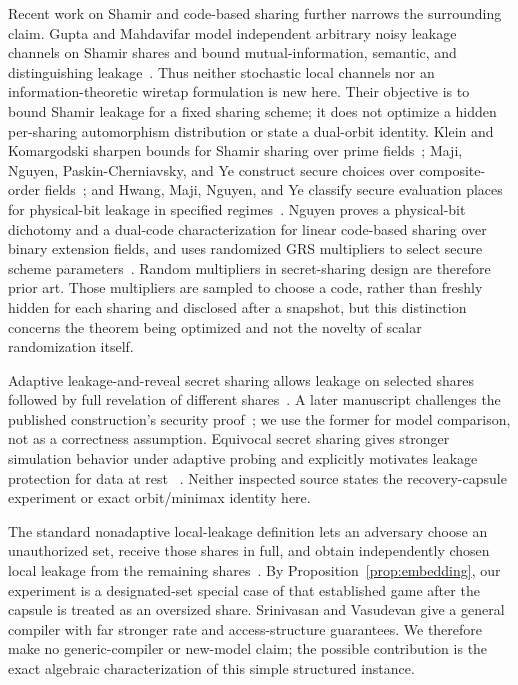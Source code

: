 \documentclass[11pt]{article}
\theoremstyle{definition}
\begin{document}
Recent work on Shamir and code-based sharing further narrows the surrounding
claim.  Gupta and Mahdavifar model independent arbitrary noisy leakage channels
on Shamir shares and bound mutual-information, semantic, and distinguishing
leakage~\cite{gupta24statistical}.  Thus neither stochastic local channels nor an
information-theoretic wiretap formulation is new here.  Their objective is to
bound Shamir leakage for a fixed sharing scheme; it does not optimize a hidden
per-sharing automorphism distribution or state a dual-orbit identity.  Klein and
Komargodski sharpen bounds for Shamir sharing over prime fields~\cite{klein23};
Maji, Nguyen, Paskin-Cherniavsky, and Ye construct secure choices over
composite-order fields~\cite{maji24composite}; and Hwang, Maji, Nguyen, and Ye
classify secure evaluation places for physical-bit leakage in specified
regimes~\cite{hwang25places}.  Nguyen proves a physical-bit dichotomy and a
dual-code characterization for linear code-based sharing over binary extension
fields, and uses randomized GRS multipliers to select secure scheme
parameters~\cite{nguyen25linear}.  Random multipliers in secret-sharing design
are therefore prior art.  Those multipliers are sampled to choose a code, rather
than freshly hidden for each sharing and disclosed after a snapshot, but this
distinction concerns the theorem being optimized and not the novelty of scalar
randomization itself.

Adaptive leakage-and-reveal secret sharing allows leakage on selected shares
followed by full revelation of different shares~\cite{ckos21}.  A later
manuscript challenges the published construction's security proof~\cite{hzw22};
we use the former for model comparison, not as a correctness assumption.
Equivocal secret sharing gives stronger simulation behavior under adaptive
probing and explicitly motivates leakage protection for data at rest
~\cite{hvw25}.  Neither inspected source states the recovery-capsule experiment
or exact orbit/minimax identity here.

The standard nonadaptive local-leakage definition lets an adversary choose an
unauthorized set, receive those shares in full, and obtain independently chosen
local leakage from the remaining shares~\cite{sv19}.  By
Proposition~\ref{prop:embedding}, our experiment is a designated-set special case
of that established game after the capsule is treated as an oversized share.
Srinivasan and Vasudevan give a general compiler with far stronger rate and
access-structure guarantees.  We therefore make no generic-compiler or new-model
claim; the possible contribution is the exact algebraic characterization of this
simple structured instance.
\end{document}
